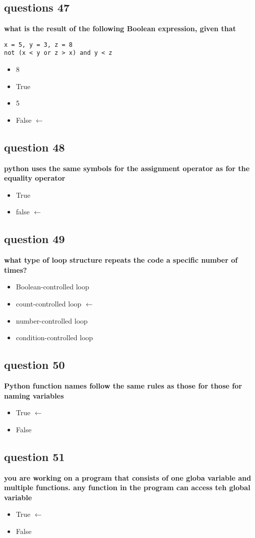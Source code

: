 \documentclass[10pt]{article}
\begin{document}
\subsection*{questions 47}
\textbf{what is the result of the following Boolean expression, given that}
\begin{verbatim}
x = 5, y = 3, z = 8
not (x < y or z > x) and y < z
\end{verbatim}
\begin{itemize}
\item 8 
\item True
\item 5
\item False $\leftarrow$
\end{itemize}
\subsection*{question 48}
\textbf{python uses the same symbols for the assignment operator as for the equality operator}
\begin{itemize}
\item True
\item false $\leftarrow$
\end{itemize}
\subsection*{question 49}
\textbf{what type of loop structure repeats the code a specific number of times?}
\begin{itemize}
\item Boolean-controlled loop
\item count-controlled loop $\leftarrow$
\item number-controlled loop
\item condition-controlled loop
\end{itemize}
\subsection*{question 50}
\textbf{Python function names follow the same rules as those for those for naming variables}
\begin{itemize}
\item True $\leftarrow$
\item False
\end{itemize}
\subsection*{question 51}
\textbf{you are working on a program that consists of one globa variable and multiple functions. any function in the program can access teh global variable}
\begin{itemize}
\item True $\leftarrow$
\item False
\end{itemize}
\end{document}

